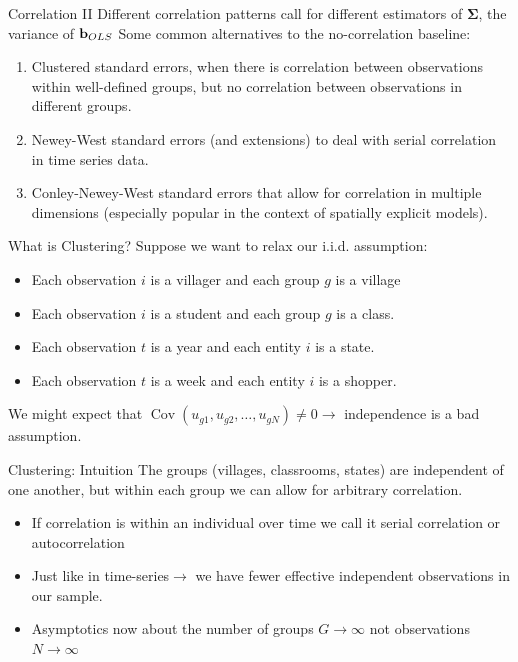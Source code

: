 \begin{frame}{Correlation II}
 Different correlation patterns call for different estimators of $\boldsymbol{\Sigma}$, the variance of ${\bf b}_{OLS}$
	Some common alternatives to the no-correlation baseline:
\begin{enumerate}
	\item Clustered standard errors, when there is correlation between observations
	within well-defined groups, but no correlation between observations in different groups. 
	\item Newey-West standard errors (and extensions) to deal with serial correlation
	in time series data.
	\item Conley-Newey-West standard errors that allow for correlation in multiple dimensions
	(especially popular in the context of spatially explicit models).
\end{enumerate}
\end{frame}


\begin{frame}{What is Clustering?}
Suppose we want to relax our i.i.d. assumption:
\begin{itemize}
\item Each observation $i$ is a \alert{villager} and each group $g$ is a \alert{village}
\item Each observation $i$ is a \alert{student} and each group $g$ is a \alert{class}.
\item Each observation $t$ is a \alert{year} and each entity $i$ is a \alert{state}.
\item Each observation $t$ is a \alert{week} and each entity $i$ is a \alert{shopper}.
\end{itemize}
We might expect that $\operatorname { Cov } (u_{g1},u_{g2},\ldots,u_{gN}) \neq 0 \rightarrow$ independence is a bad assumption. 
\end{frame}

\begin{frame}{Clustering: Intuition}
The groups (villages, classrooms, states) are independent of one another, but within each group we can allow for arbitrary correlation.
\begin{itemize}
\item If correlation is within an individual over time we call it \alert{serial correlation} or \alert{autocorrelation}
\item Just like in time-series$\rightarrow$ we have fewer effective independent observations in our sample.
\item Asymptotics now about the number of groups $G \rightarrow \infty$ not observations $N \rightarrow \infty$
\end{itemize}
\end{frame}


